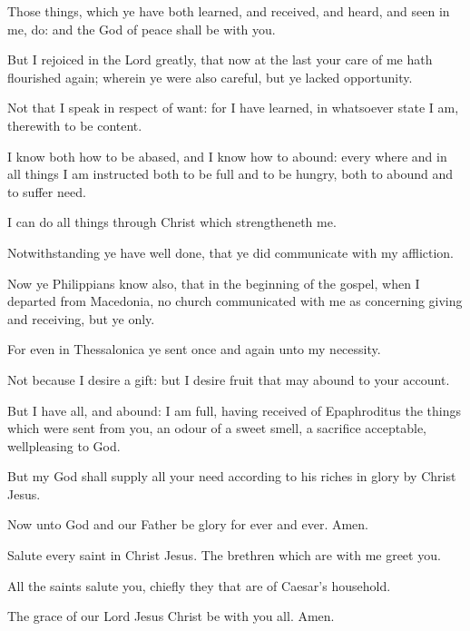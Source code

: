 \verse Those things, which ye have both learned, and received, and heard, and seen in me, do: and the God of peace shall be with you.

\verse But I rejoiced in the Lord greatly, that now at the last your care of me hath flourished again; wherein ye were also careful, but ye lacked opportunity.

\verse Not that I speak in respect of want: for I have learned, in whatsoever state I am, therewith to be content.

\verse I know both how to be abased, and I know how to abound: every where and in all things I am instructed both to be full and to be hungry, both to abound and to suffer need.

\verse I can do all things through Christ which strengtheneth me.

\verse Notwithstanding ye have well done, that ye did communicate with my affliction.

\verse Now ye Philippians know also, that in the beginning of the gospel, when I departed from Macedonia, no church communicated with me as concerning giving and receiving, but ye only.

\verse For even in Thessalonica ye sent once and again unto my necessity.

\verse Not because I desire a gift: but I desire fruit that may abound to your account.

\verse But I have all, and abound: I am full, having received of Epaphroditus the things which were sent from you, an odour of a sweet smell, a sacrifice acceptable, wellpleasing to God.

\verse But my God shall supply all your need according to his riches in glory by Christ Jesus.

\verse Now unto God and our Father be glory for ever and ever. Amen.

\verse Salute every saint in Christ Jesus. The brethren which are with me greet you.

\verse All the saints salute you, chiefly they that are of Caesar's household.

\verse The grace of our Lord Jesus Christ be with you all. Amen.

